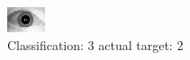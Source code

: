 \begin{figure}[h!]
\begin{center}
\includegraphics[width=0.60\columnwidth]{figures/ID1717_class_3_target_2.png}
\end{center}
\caption{ Classification: 3 actual target: 2}
\label{fig:ID1717_class_3_target_2}
\end{figure}
